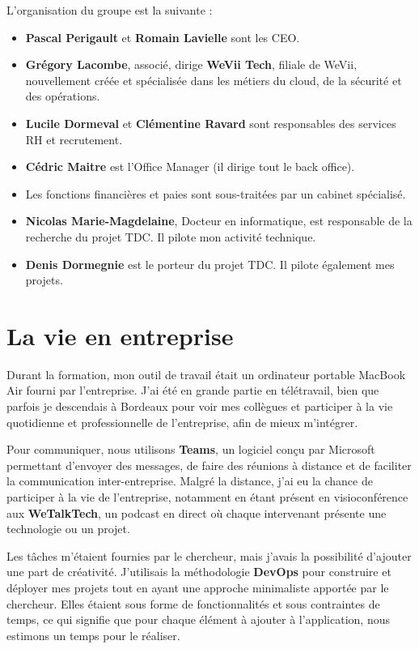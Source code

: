 L'organisation du groupe est la suivante :
\begin{itemize}
    \item \textbf{Pascal Perigault} et \textbf{Romain Lavielle} sont les CEO.
    \item \textbf{Grégory Lacombe}, associé, dirige \textbf{WeVii Tech}, filiale de WeVii, nouvellement créée et spécialisée dans les métiers du cloud, de la sécurité et des opérations.
    \item \textbf{Lucile Dormeval} et \textbf{Clémentine Ravard} sont responsables des services RH et recrutement.
    \item \textbf{Cédric Maitre} est l'Office Manager (il dirige tout le back office).
    \item Les fonctions financières et paies sont sous-traitées par un cabinet spécialisé.
    \item \textbf{Nicolas Marie-Magdelaine}, Docteur en informatique, est responsable de la recherche du projet TDC. Il pilote mon activité technique.
    \item \textbf{Denis Dormegnie} est le porteur du projet TDC. Il pilote également mes projets.
\end{itemize}

\section{La vie en entreprise}

Durant la formation, mon outil de travail était un ordinateur portable MacBook Air fourni par l’entreprise.
J’ai été en grande partie en télétravail, bien que parfois je descendais à Bordeaux pour voir mes collègues et participer à la vie quotidienne et professionnelle de l’entreprise, afin de mieux m'intégrer.

\bigskip

Pour communiquer, nous utilisons \textbf{Teams}, un logiciel conçu par Microsoft permettant d’envoyer des messages, de faire des réunions à distance et de faciliter la communication inter-entreprise.
Malgré la distance, j’ai eu la chance de participer à la vie de l’entreprise, notamment en étant présent en visioconférence aux \textbf{WeTalkTech}, un podcast en direct où chaque intervenant présente une technologie ou un projet.

\bigskip

Les tâches m’étaient fournies par le chercheur, mais j’avais la possibilité d’ajouter une part de créativité.
J’utilisais la méthodologie \textbf{DevOps} pour construire et déployer mes projets tout en ayant une approche minimaliste apportée par le chercheur. Elles étaient sous forme de fonctionnalités et sous contraintes de temps, ce qui signifie que pour chaque élément à ajouter à l’application, nous estimons un temps pour le réaliser.

\clearpage
